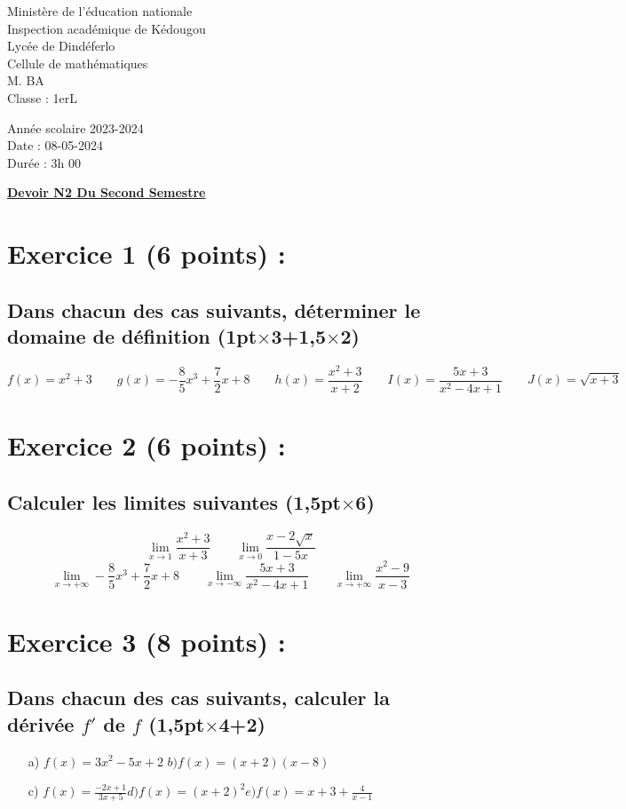 \documentclass{article}
\begin{document}
\begin{minipage}{0.5\textwidth}
	Ministère de l'éducation nationale  \\
	Inspection académique de Kédougou   \\
	Lycée de Dindéferlo            \\
	Cellule de mathématiques            \\
	M. BA                          \\
	Classe : 1erL  \\
\end{minipage}
\begin{minipage}{0.5\textwidth}
	Année scolaire 2023-2024 \\
	Date : 08-05-2024 \\
	Durée : 3h 00 \\
\end{minipage}

\begin{center}
	\textbf{{\underline{ Devoir N2 Du Second Semestre}}}
\end{center}
\section*{Exercice 1 (6 points) :}
\subsection*{Dans chacun des cas suivants, déterminer le domaine de définition \textbf{(1pt$\times$3+1,5$\times$2)}}
\[ f(x)=x^2+3 \quad\quad g(x)=-\frac{8}{5}x^{3}+\frac{7}{2}x+8\quad\quad
h(x)=\frac{x^2+3}{x+2}\quad\quad I(x)=\frac{5x+3}{x^{2}-4x+1}\quad\quad J(x)=\sqrt{x+3}\]
\section*{Exercice 2 (6 points) :}
\subsection*{Calculer les limites suivantes \textbf{(1,5pt$\times$6)}}
\[\lim_{x \to 1}\frac{x^{2}+3}{x+3}\quad\quad\lim_{x \to 0}\frac{x-2\sqrt{x}}{1-5x}\]
\[\lim_{x \to +\infty}-\frac{8}{5}x^{3}+\frac{7}{2}x+8\quad\quad \lim_{x \to -\infty}\frac{5x+3}{x^{2}-4x+1}\quad\quad \lim_{x \to +\infty}\frac{x^{2}-9}{x-3}\]
\section*{Exercice 3 (8 points) :}
\subsection*{ Dans chacun des cas suivants, calculer la dérivée $f'$ de $f$ \textbf{(1,5pt$\times$4+2)}}
\begin{itemize}
\item[a)]$f(x)=3x^{2}-5x+2$\quad\quad 
$b)f(x)=(x+2)(x-8)$
\item[c)]$f(x)=\frac{-2x+1}{3x+5}$\quad\quad $d)f(x)=(x+2)^{2}$\quad\quad $e)f(x)=x+3+\frac{4}{x-1}$
\end{itemize}
\end{document}

